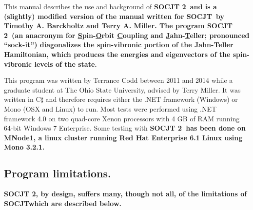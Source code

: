 \documentclass{article}
\newcommand{\ul}{\underline }
\newcommand{\socjttwo}{\bf{SOCJT 2}}
\newcommand{\socjt}{{\bf SOCJT}}
\newcommand{\socrt}{{\bf SOCRT}}
\begin{document}
This manual describes the use and background of \socjttwo\ and is a (slightly) modified version of the manual written for \socjt\ by Timothy A. Barckholtz and Terry A. Miller.
The program \socjttwo\ (an anacronym for {\ul S}pin-{\ul O}rbit {\ul C}oupling
and {\ul J}ahn-{\ul T}eller; pronounced ``sock-it'') diagonalizes the
spin-vibronic portion of the Jahn-Teller Hamiltonian, which produces
the energies and eigenvectors of the spin-vibronic levels of the
state.

\begin{comment}
Besides diagonalizing the spin-vibronic Hamiltonian, the programs
\socjt\ and \socrt\ calculate several properties of the system. All of
these properties are detailed later in section \ref{section:output}.
One of the most important items calculated by \socjt\ is the relative
intensities of the vibronic transitions involved in an electronic
transition to and from the degenerate state. These calculations assume
diagonal Franck-Condon factors, and only the intensities of
progressions of the Jahn-Teller active modes are computed. In the main
\socjt\ and \socrt\ programs, it is assumed that the non-Jahn-Teller
active state involved in the electronic transition is a singly
degenerate or non-Jahn-Teller active degenerate state.
\end{comment}

This program was written by Terrance Codd between 2011 and 2014 while
a graduate student at The Ohio State University, advised by Terry
Miller. It was written in C$\sharp$ and therefore requires either the .NET framework (Windows) or Mono (OSX and Linux) to run.  Most tests were performed using .NET framework 4.0 on two quad-core Xenon processors with 4 GB of RAM running 64-bit Windows 7 Enterprise.  Some testing with \socjttwo\ has been done on MNode1, a linux cluster running Red Hat Enterprise 6.1 Linux using Mono 3.2.1.
\begin{comment}
A version for the Cray
operating system is available upon request, as is the source code for
the DOS versions. This program should be cited as: Barckholtz, T. A.;
Miller, T. A.  {\it Int. Rev. Phys. Chem.}, {\bf 1998}, {\it 17},
435-524.
\end{comment}

\subsection{Program limitations.} \label{section:limitations}
\socjttwo, by design, suffers many, though not all, of the limitations of \socjt which are described below.
\end{document}
